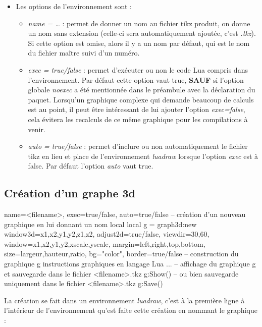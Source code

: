 \documentclass[%
10pt,%
a4paper,%
french,%
]%
{article}%
\begin{document}
\begin{itemize}
    \item Les options de l'environnement sont :
    \begin{itemize}
    \item \emph{name = \ldots{}} : permet de donner un nom au fichier tikz produit, on donne un nom sans extension (celle-ci sera automatiquement ajoutée, c'est \emph{.tkz}). Si cette option est omise, alors il y a un nom par défaut, qui est le nom du fichier maître suivi d'un numéro.
    \item \emph{exec = true/false} : permet d'exécuter ou non le code Lua compris dans l'environnement. Par défaut cette option vaut true, \textbf{SAUF} si l'option globale \emph{noexec} a été mentionnée dans le préambule avec la déclaration du paquet. Lorsqu'un graphique complexe qui demande beaucoup de calculs est au point, il peut être intéressant de lui ajouter l'option \emph{exec=false}, cela évitera les recalculs de ce même graphique pour les compilations à venir.
    \item \emph{auto = true/false} : permet d'inclure ou non automatiquement le fichier tikz en lieu et place de l'environnement \emph{luadraw} lorsque l'option \emph{exec} est à false. Par défaut l'option \emph{auto} vaut true.
    \end{itemize}
\end{itemize}


\subsection{Création d'un graphe 3d}

\begin{TeXcode}
\begin{luadraw}{ name=<filename>, exec=true/false, auto=true/false }
-- création d'un nouveau graphique en lui donnant un nom local
local g = graph3d:new{ window3d={x1,x2,y1,y2,z1,z2}, adjust2d=true/false, viewdir={30,60}, window={x1,x2,y1,y2,xscale,yscale}, margin={left,right,top,bottom}, size={largeur,hauteur,ratio}, bg="color", border=true/false }
-- construction du graphique g
    instructions graphiques en langage Lua ...
-- affichage du graphique g et sauvegarde dans le fichier <filename>.tkz
g:Show()
-- ou bien sauvegarde uniquement dans le fichier <filename>.tkz
g:Save()
\end{luadraw}
\end{TeXcode}

La création se fait dans un environnement \emph{luadraw}, c'est à la première ligne à l'intérieur de l'environnement qu'est faite cette création en nommant le graphique :
\end{document}
